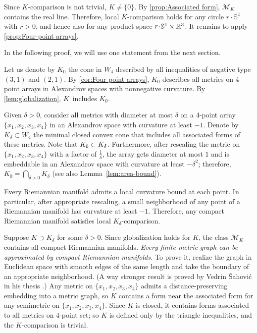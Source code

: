 \documentclass[a4paper,10pt]{article}
\begin{document}
Since $K$-comparison is not trivial, $K\ne\{0\}$.
By \ref{prop:Associated form}, $\mathcal{M}_K$ contains the real line.
Therefore, local $K$-comparison holds
for any circle $r\cdot \mathbb{S}^1$ with $r>0$, and hence also for any product space $r\cdot \mathbb{S}^1\times\RR^3$.
It remains to apply \ref{prop:Four-point arrays}.
\qeds

In the following proof, we will use one statement from the next section.

Let us denote by $K_0$ the cone in $W_4$ described by all inequalities of negative type $(3,1)$ and $(2,1)$.
By \ref{cor:Four-point arrays}, $K_0$ describes all metrics on 4-point arrays in Alexandrov spaces with nonnegative curvature.
By \ref{lem:globalization},  $K$~includes $K_0$.

Given $\delta>0$, consider all metrics with diameter at most $\delta$ on a 4-point array $\{x_1,x_2,x_3,x_4\}$ in an Alexandrov space with curvature at least $-1$.
Denote by $K_\delta\subset W_4$ the minimal closed convex cone that includes all associated forms of these metrics.
Note that $K_0\z\subset K_\delta$.
Furthermore, after rescaling the metric on $\{x_1,x_2,x_3,x_4\}$ with a factor of $\tfrac1\delta$, the array gets diameter at most $1$ and is embeddable in an Alexandrov space with curvature at least $-\delta^2$; therefore, $K_0=\bigcap_{\delta>0} K_\delta$ (see also Lemma~\ref{lem:area-bound}).

Every Riemannian manifold admits a local curvature bound at each point.
In particular, after appropriate rescaling, a small neighborhood of any point of a Riemannian manifold has curvature at least $-1$.
Therefore, any compact Riemannian manifold satisfies local $K_\delta$-comparison.

Suppose $K\supset K_\delta$ for some $\delta>0$.
Since globalization holds for $K$, the class $\mathcal{M}_K$ contains all compact Riemannian manifolds.
\textit{Every finite metric graph can be approximated by compact Riemannian manifolds.}
To prove it,
realize the graph in Euclidean space with smooth edges of the same length and take the boundary of an appropriate neighborhood.
(A way stronger result is proved by Vedrin Šahović in his thesis \cite{sahovic2009}.)
Any metric on $\{x_1,x_2,x_3,x_4\}$ admits a distance-preserving embedding into a metric graph, so $K$ contains a form near the associated form for any semimetric on $\{x_1,x_2,x_3,x_4\}$.
Since $K$ is closed, it contains forms associated to all metrics on 4-point set;
so $K$ is defined only by the triangle inequalities, and the $K$-comparison is trivial.
\end{document}
